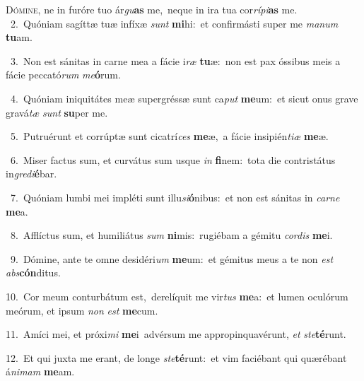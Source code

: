 \lettrine{\initial\textcolor{\initialcolor}{D}}{ómine,} ne in furóre tuo ár\-\textit{gu}\-\textbf{as} me,~\star neque in ira tua cor\-\textit{rí}\-\textit{pi}\textbf{as} me.\\
{\numbfont\textcolor{\numbcolor}{~2.}}~Quóniam sagíttæ tuæ infíxæ \textit{sunt} \textbf{mi}\-hi:~\star et confirmásti super me \textit{ma}\-\textit{num} \textbf{tu}\-am.\par
{\numbfont\textcolor{\numbcolor}{~3.}}~Non est sánitas in carne mea a fácie i\textit{ræ} \textbf{tu}\-æ:~\star non est pax óssibus meis a fácie peccató\textit{rum} \textit{me}\-\textbf{ó}rum.\par
{\numbfont\textcolor{\numbcolor}{~4.}}~Quóniam iniquitátes meæ supergréssæ sunt ca\textit{put} \textbf{me}\-um:~\star et sicut onus grave gravá\textit{tæ} \textit{sunt} \textbf{su}\-per me.\par
{\numbfont\textcolor{\numbcolor}{~5.}}~Putruérunt et corrúptæ sunt cicatrí\textit{ces} \textbf{me}\-æ,~\star a fácie insipién\-\textit{ti}\-\textit{æ} \textbf{me}\-æ.\par
{\numbfont\textcolor{\numbcolor}{~6.}}~Miser factus sum, et curvátus sum usque \textit{in} \textbf{fi}\-nem:~\star tota die contristátus in\-\textit{gre}\-\textit{di}\textbf{é}bar.\par
{\numbfont\textcolor{\numbcolor}{~7.}}~Quóniam lumbi mei impléti sunt illu\-\textit{si}\-\textbf{ó}nibus:~\star et non est sánitas in \textit{car}\-\textit{ne} \textbf{me}\-a.\par
{\numbfont\textcolor{\numbcolor}{~8.}}~Afflíctus sum, et humiliátus \textit{sum} \textbf{ni}\-mis:~\star rugiébam a gémitu \textit{cor}\-\textit{dis} \textbf{me}\-i.\par
{\numbfont\textcolor{\numbcolor}{~9.}}~Dómine, ante te omne desidéri\textit{um} \textbf{me}\-um:~\star et gémitus meus a te non \textit{est} \textit{abs}\-\textbf{cón}ditus.\par
{\numbfont\textcolor{\numbcolor}{10.}}~Cor meum conturbátum est,~\dagger derelíquit me vir\textit{tus} \textbf{me}\-a:~\star et lumen oculórum meórum, et ipsum \textit{non} \textit{est} \textbf{me}\-cum.\par
{\numbfont\textcolor{\numbcolor}{11.}}~Amíci mei, et próxi\textit{mi} \textbf{me}\-i~\star advérsum me appropinquavérunt, \textit{et} \textit{ste}\-\textbf{té}runt.\par
{\numbfont\textcolor{\numbcolor}{12.}}~Et qui juxta me erant, de longe \textit{ste}\-\textbf{té}runt:~\star et vim faciébant qui quærébant á\-\textit{ni}\-\textit{mam} \textbf{me}\-am.\par

